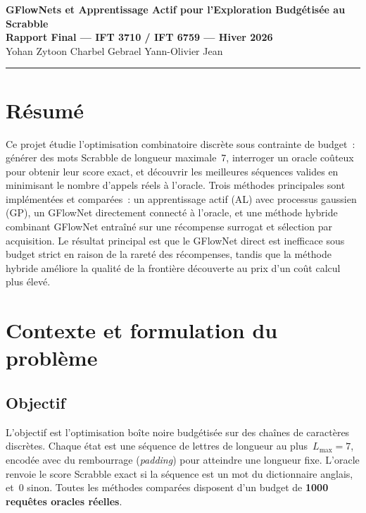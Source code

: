 \documentclass[10pt]{article}
\begin{document}
\begin{center}
    {\Large \textbf{GFlowNets et Apprentissage Actif pour l'Exploration Budgétisée au Scrabble}}\\[0.4em]
    \textbf{Rapport Final --- IFT 3710 / IFT 6759 --- Hiver 2026}\\[0.2em]
    {\small Yohan Zytoon \quad Charbel Gebrael \quad Yann-Olivier Jean}
\end{center}

\hrule
\vspace{0.5em}

\section*{Résumé}
Ce projet étudie l'optimisation combinatoire discrète sous contrainte de budget~: générer des mots Scrabble de longueur maximale~7, interroger un oracle coûteux pour obtenir leur score exact, et découvrir les meilleures séquences valides en minimisant le nombre d'appels réels à l'oracle. Trois méthodes principales sont implémentées et comparées~: un apprentissage actif (AL) avec processus gaussien (GP), un GFlowNet directement connecté à l'oracle, et une méthode hybride combinant GFlowNet entraîné sur une récompense surrogat et sélection par acquisition. Le résultat principal est que le GFlowNet direct est inefficace sous budget strict en raison de la rareté des récompenses, tandis que la méthode hybride améliore la qualité de la frontière découverte au prix d'un coût calcul plus élevé.

\section{Contexte et formulation du problème}

\subsection{Objectif}
L'objectif est l'optimisation boîte noire budgétisée sur des chaînes de caractères discrètes. Chaque état est une séquence de lettres de longueur au plus~$L_{\max}=7$, encodée avec du rembourrage (\emph{padding}) pour atteindre une longueur fixe. L'oracle renvoie le score Scrabble exact si la séquence est un mot du dictionnaire anglais, et~$0$ sinon. Toutes les méthodes comparées disposent d'un budget de \textbf{1000 requêtes oracles réelles}.
\end{document}
